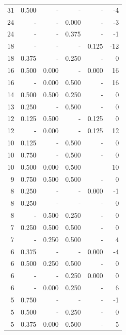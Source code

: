 \documentclass[a4paper]{article}\usepackage{graphicx, color}
\begin{document}
\begin{table}[ht]
\begin{tabular}{rrrrrr}
   \rowcolor{nullColor} 31 & 0.500 & - & - & - & -4 \\ 
   \rowcolor{sosoColor} 24 & - & - & 0.000 & - & -3 \\ 
   \rowcolor{sosoColor} 24 & - & - & 0.375 & - & -1 \\ 
   \rowcolor{nullColor} 18 & - & - & - & 0.125 & -12 \\ 
   \rowcolor{sosoColor} 18 & 0.375 & - & 0.250 & - & 0 \\ 
  16 & 0.500 & 0.000 & - & 0.000 & 16 \\ 
   \rowcolor{badColor} 16 & - & 0.000 & 0.500 & - & 16 \\ 
   \rowcolor{badColor} 14 & 0.500 & 0.500 & 0.250 & - & 0 \\ 
   \rowcolor{sosoColor} 13 & 0.250 & - & 0.500 & - & 0 \\ 
  12 & 0.125 & 0.500 & - & 0.125 & 0 \\ 
  12 & - & 0.000 & - & 0.125 & 12 \\ 
   \rowcolor{sosoColor} 10 & 0.125 & - & 0.500 & - & 0 \\ 
   \rowcolor{sosoColor} 10 & 0.750 & - & 0.500 & - & 0 \\ 
   \rowcolor{badColor} 10 & 0.500 & 0.000 & 0.500 & - & 10 \\ 
   \rowcolor{goodColor} 9 & 0.750 & 0.500 & 0.500 & - & 0 \\ 
   \rowcolor{nullColor} 8 & 0.250 & - & - & 0.000 & -1 \\ 
   \rowcolor{nullColor} 8 & 0.250 & - & - & - & 0 \\ 
   \rowcolor{badColor} 8 & - & 0.500 & 0.250 & - & 0 \\ 
   \rowcolor{goodColor} 7 & 0.250 & 0.500 & 0.500 & - & 0 \\ 
   \rowcolor{badColor} 7 & - & 0.250 & 0.500 & - & 4 \\ 
   \rowcolor{nullColor} 6 & 0.375 & - & - & 0.000 & -4 \\ 
   \rowcolor{badColor} 6 & 0.500 & 0.250 & 0.500 & - & 0 \\ 
   \rowcolor{sosoColor} 6 & - & - & 0.250 & 0.000 & 0 \\ 
   \rowcolor{badColor} 6 & - & 0.000 & 0.250 & - & 6 \\ 
   \rowcolor{nullColor} 5 & 0.750 & - & - & - & -1 \\ 
   \rowcolor{sosoColor} 5 & 0.500 & - & 0.250 & - & 0 \\ 
   \rowcolor{badColor} 5 & 0.375 & 0.000 & 0.500 & - & 5 \\ 

\end{tabular}
\end{table}
\end{document}
